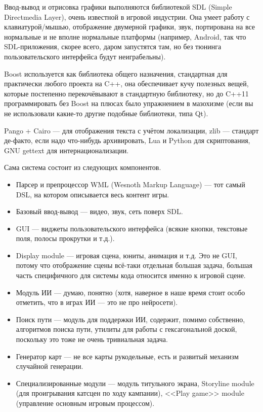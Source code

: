 \documentclass{../text-style}
\begin{document}
Ввод-вывод и отрисовка графики выполняются библиотекой SDL (Simple Directmedia Layer), очень известной в игровой индустрии. Она умеет работу с клавиатурой/мышью, отображение двумерной графики, звук, портирована на все нормальные и не вполне нормальные платформы (например, Android, так что SDL-приложения, скорее всего, даром запустятся там, но без тюнинга пользовательского интерфейса будут неиграбельны).

Boost используется как библиотека общего назначения, стандартная для практически любого проекта на C++, она обеспечивает кучу полезных вещей, которые постепенно перекочёвывают в стандартную библиотеку, но до C++11 программировать без Boost на плюсах было упражнением в мазохизме (если вы не использовали какие-то другие подобные библиотеки, типа Qt).

Pango + Cairo --- для отображения текста с учётом локализации, zlib --- стандарт де-факто, если надо что-нибудь архивировать, Lua и Python для скриптования, GNU gettext для интернационализации.

Сама система состоит из следующих компонентов.

\begin{itemize}
    \item Парсер и препроцессор WML (Wesnoth Markup Language) --- тот самый DSL, на котором описывается весь контент игры.
    \item Базовый ввод-вывод --- видео, звук, сеть поверх SDL.
    \item GUI --- виджеты пользовательского интерфейса (всякие кнопки, текстовые поля, полосы прокрутки и т.д.).
    \item Display module --- игровая сцена, юниты, анимация и т.д. Это не GUI, потому что отображение сцены всё-таки отдельная большая задача, большая часть специфичного для системы кода относится именно к игровой сцене.
    \item Модуль ИИ --- думаю, понятно (хотя, наверное в наше время стоит особо отметить, что в играх ИИ --- это не про нейросети).
    \item Поиск пути --- модуль для поддержки ИИ, содержит, помимо собственно, алгоритмов поиска пути, утилиты для работы с гексагональной доской, поскольку это тоже не очень тривиальная задача.
    \item Генератор карт --- не все карты рукодельные, есть и развитый механизм случайной генерации.
    \item Специализированные модули --- модуль титульного экрана, Storyline module (для проигрывания катсцен по ходу кампании), <<Play game>> module (управление основным игровым процессом).
\end{itemize}
\end{document}
